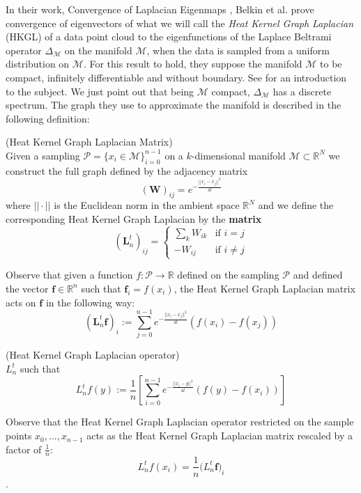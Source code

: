 In their work, Convergence of Laplacian Eigenmaps \cite{NIPS2006_2989}, Belkin et al. prove convergence of eigenvectors of what we will call the \textit{Heat Kernel Graph Laplacian} (HKGL) of a data point cloud to the eigenfunctions of the Laplace Beltrami operator $\Delta_\mathcal M$ on the manifold $\mathcal M$, when the data is sampled from a uniform distribution on $\mathcal M$.
For this result to hold, they suppose the manifold $\mathcal M$ to be compact, infinitely differentiable and without boundary. See \cite{rosenberg_1997} for an introduction to the subject. We just point out that being $\mathcal M$ compact, $\Delta_\mathcal M$ has a discrete spectrum. The graph they use to approximate the manifold is described in the following definition: 
\vspace{0.5cm}
\begin{definition}{}(Heat Kernel Graph Laplacian Matrix)\\
	\label{def:Heat Kernel Graph Laplacian Matrix}
	Given a sampling $ \mathcal P = \{x_i\in\mathcal M\}_{i=0}^{n-1}$ on a $k$-dimensional manifold $\mathcal M\subset \mathbb R^N$ we construct the full graph defined by the adjacency matrix 
	$$(\mathbf W)_{ij}=e^{-\frac{||x_i-x_j||^2}{4t}}$$
	where $||\cdot||$ is the Euclidean norm in the ambient space $\mathbb R^N$ and we define the corresponding Heat Kernel Graph Laplacian by the \textbf{matrix} 
	$$(\mathbf{L}_n^t)_{ij}=\begin{cases}
	\sum_k W_{ik} & \text{if }i=j\\
	-W_{ij}&\text{if }i\neq j
	\end{cases}$$
\end{definition}
\vspace{0.5cm}
Observe that given a function $f: \mathcal P \rightarrow \mathbb R$ defined on the sampling $ \mathcal P$ and defined the vector $\mathbf f\in\mathbb R^n$ such that $\mathbf f_i = f(x_i)$, the Heat Kernel Graph Laplacian matrix acts on $\mathbf f$ in the following way:
$$ (\mathbf L_n^t \mathbf f)_i:=  \sum_{j=0}^{n-1} e^{-\frac{||x_i-x_j||^2}{4t}}\left(f(x_i)-f(x_j)\right)$$
\vspace{0.5cm}
\begin{definition}{}(Heat Kernel Graph Laplacian operator)\\
	\label{def:Heat Kernel Graph Laplacian operator}
	$L_n^t$ such that
	$$L_n^tf(y) := \frac{1}{n}\left[ \sum_{i=0}^{n-1} e^{-\frac{||x_i-y||^2}{4t}}\left(f(y)-f(x_i)\right)\right]$$
\end{definition}
\vspace{0.5cm}
Observe that the Heat Kernel Graph Laplacian operator restricted on the sample points $x_0, ..., x_{n-1}$ acts as the Heat Kernel Graph Laplacian matrix rescaled by a factor of $\frac{1}{n}$:
$$L_n^tf(x_i) = \frac{1}{n}\mathbf (L_n^t\mathbf f)_i$$.

